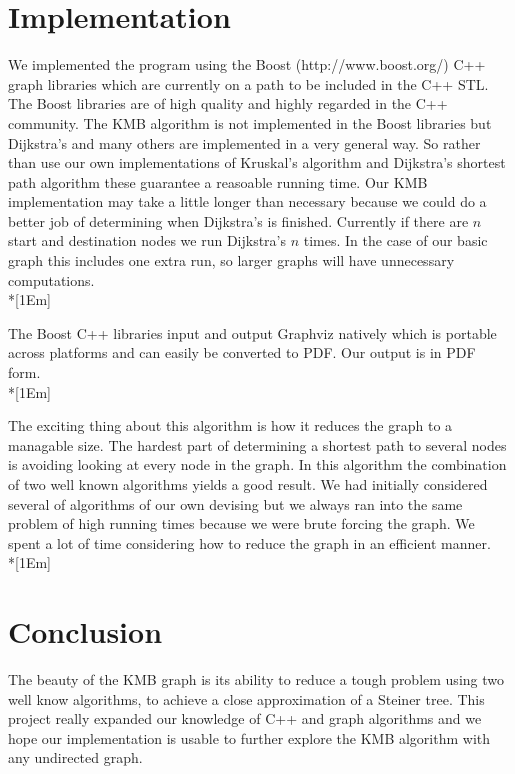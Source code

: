 \documentclass[12pt]{article}
\begin{document}
\begin{raggedright}
\section*{Implementation}
We implemented the program using the Boost (http://www.boost.org/) C++ graph 
libraries which are currently on a path to be included in the C++ STL. The Boost
libraries are of high quality and highly regarded in the C++ community. The KMB 
algorithm is not implemented in the Boost libraries but Dijkstra's and many 
others are implemented in a very general way. So rather than use our own 
implementations of Kruskal's algorithm and Dijkstra's shortest path algorithm 
these guarantee a reasoable running time. Our KMB implementation may take a 
little longer than necessary because we could do a better job of determining 
when Dijkstra's is finished. Currently if there are $n$ start and destination 
nodes we run Dijkstra's $n$ times. In the case of our basic graph this includes
one extra run, so larger graphs will have unnecessary computations.\\*[1Em]

The Boost C++ libraries input and output Graphviz natively which is portable 
across platforms and can easily be converted to PDF. Our output is in PDF form.\\*[1Em]

The exciting thing about this algorithm is how it reduces the graph to a managable
size. The hardest part of determining a shortest path to several nodes is avoiding
looking at every node in the graph. In this algorithm the combination of two well
known algorithms yields a good result. We had initially considered several of 
algorithms of our own devising but we always ran into the same problem of high
running times because we were brute forcing the graph. We spent a lot of time
considering how to reduce the graph in an efficient manner.\\*[1Em]

\section*{Conclusion}
The beauty of the KMB graph is its ability to reduce a tough problem using two
well know algorithms, to achieve a close approximation of a Steiner tree. This 
project really expanded our knowledge of C++ and graph algorithms and we hope our
implementation is usable to further explore the KMB algorithm with any undirected
graph.

\end{raggedright}
\nocite{ks:pzh}


\end{document}
